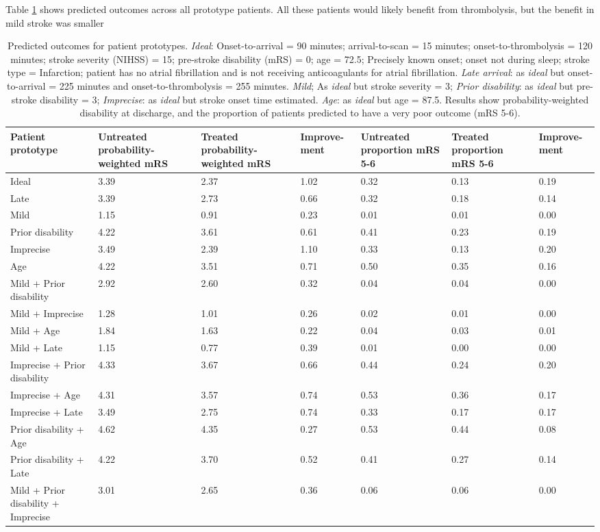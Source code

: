 Table \ref{tab:prototype_outcomes} shows predicted outcomes across all prototype patients. All these patients would likely benefit from thrombolysis, but the benefit in mild stroke was smaller

\begin{minipage}{1\textwidth}
\small
\begin{longtable}{p{5.2cm} | p{1.6cm} p{1.6cm} p{1.5cm} | p{1.6cm} p{1.6cm} p{1.5cm}}
\caption{Predicted outcomes for patient prototypes. \textit{Ideal}: Onset-to-arrival = 90 minutes; arrival-to-scan = 15 minutes; onset-to-thrombolysis = 120 minutes; stroke severity (NIHSS) = 15; pre-stroke disability (mRS) = 0; age = 72.5; Precisely known onset; onset not during sleep; stroke type = Infarction; patient has no atrial fibrillation and is not receiving anticoagulants for atrial fibrillation. \textit{Late arrival}: as \textit{ideal} but onset-to-arrival = 225 minutes and onset-to-thrombolysis = 255 minutes. \textit{Mild}; As \textit{ideal} but stroke severity = 3; \textit{Prior disability}: as \textit{ideal} but pre-stroke disability = 3; \textit{Imprecise}: as \textit{ideal} but stroke onset time estimated. \textit{Age}: as \textit{ideal} but age = 87.5. Results show probability-weighted disability at discharge, and the proportion of patients predicted to have a very poor outcome (mRS 5-6).}\\
\label{tab:prototype_outcomes}
\endhead
Patient prototype & Untreated probability-weighted mRS & Treated probability-weighted mRS & Improve-ment & Untreated proportion mRS 5-6 & Treated proportion mRS 5-6 & Improve-ment\\
\midrule
Ideal & 3.39 & 2.37 & 1.02 & 0.32 & 0.13 & 0.19\\
Late & 3.39 & 2.73 & 0.66 & 0.32 & 0.18 & 0.14\\
Mild & 1.15 & 0.91 & 0.23 & 0.01 & 0.01 & 0.00\\
Prior disability & 4.22 & 3.61 & 0.61 & 0.41 & 0.23 & 0.19\\
Imprecise & 3.49 & 2.39 & 1.10 & 0.33 & 0.13 & 0.20\\
Age & 4.22 & 3.51 & 0.71 & 0.50 & 0.35 & 0.16\\
Mild + Prior disability & 2.92 & 2.60 & 0.32 & 0.04 & 0.04 & 0.00\\
Mild + Imprecise & 1.28 & 1.01 & 0.26 & 0.02 & 0.01 & 0.00\\
Mild + Age & 1.84 & 1.63 & 0.22 & 0.04 & 0.03 & 0.01\\
Mild + Late & 1.15 & 0.77 & 0.39 & 0.01 & 0.00 & 0.00\\
Imprecise + Prior disability & 4.33 & 3.67 & 0.66 & 0.44 & 0.24 & 0.20\\
Imprecise + Age & 4.31 & 3.57 & 0.74 & 0.53 & 0.36 & 0.17\\
Imprecise + Late & 3.49 & 2.75 & 0.74 & 0.33 & 0.17 & 0.17\\
Prior disability + Age & 4.62 & 4.35 & 0.27 & 0.53 & 0.44 & 0.08\\
Prior disability + Late & 4.22 & 3.70 & 0.52 & 0.41 & 0.27 & 0.14\\
Mild + Prior disability + Imprecise & 3.01 & 2.65 & 0.36 & 0.06 & 0.06 & 0.00\\


\end{longtable}
\end{minipage}
